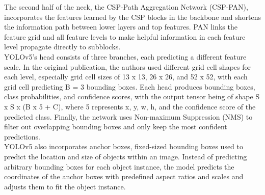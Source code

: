 \documentclass[10pt,twocolumn,letterpaper]{article}
\begin{document}
The second half of the neck, the CSP-Path Aggregation Network (CSP-PAN), incorporates the features learned by the CSP blocks in the backbone and shortens the information path between lower layers and top features. PAN links the feature grid and all feature levels to make helpful information in each feature level propagate directly to subblocks. \\
YOLOv5’s head consists of three branches, each predicting a different feature scale. In the original publication, the authors used different grid cell shapes for each level, especially grid cell sizes of 13 x 13, 26 x 26, and 52 x 52, with each grid cell predicting B = 3 bounding boxes. Each head produces bounding boxes, class probabilities, and confidence scores, with the output tensor being of shape S x S x (B x 5 + C), where 5 represents x, y, w, h, and the confidence score of the predicted class. Finally, the network uses Non-maximum Suppression (NMS) to filter out overlapping bounding boxes and only keep the most confident predictions.\\
YOLOv5 also incorporates anchor boxes, fixed-sized bounding boxes used to predict the location and size of objects within an image. Instead of predicting arbitrary bounding boxes for each object instance, the model predicts the coordinates of the anchor boxes with predefined aspect ratios and scales and adjusts them to fit the object instance.\\
\end{document}
